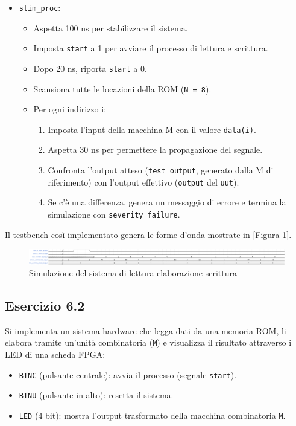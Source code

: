 \begin{enumerate}
\begin{itemize}
        \item \texttt{stim\_proc}:
        \begin{itemize}
            \item Aspetta 100 ns per stabilizzare il sistema.
            \item Imposta \texttt{start} a 1 per avviare il processo di lettura e scrittura.
            \item Dopo 20 ns, riporta \texttt{start} a 0.
            \item Scansiona tutte le locazioni della ROM (\texttt{N = 8}).
            \item Per ogni indirizzo i:
            \begin{enumerate}
                \item Imposta l'input della macchina M con il valore \texttt{data(i)}.
                \item Aspetta 30 ns per permettere la propagazione del segnale.
                \item Confronta l'output atteso (\texttt{test\_output}, generato dalla M di riferimento) con l'output effettivo (\texttt{output} del \texttt{uut}).
                \item Se c'è una differenza, genera un messaggio di errore e termina la simulazione con \texttt{severity failure}.
            \end{enumerate}
        \end{itemize}
    \end{itemize}
\end{enumerate}

Il testbench così implementato genera le forme d'onda mostrate in [Figura \ref{fig:rom_m_mem_tb}].

\begin{figure}[h]
    \centering
    \includegraphics[width=\textwidth]{img/rom_m_mem_tb.pdf}
    \caption{Simulazione del sistema di lettura-elaborazione-scrittura}
    \label{fig:rom_m_mem_tb}
\end{figure}

\subsection{Esercizio 6.2}
Si implementa un sistema hardware che legga dati da una memoria ROM, li elabora tramite un'unità combinatoria (\texttt{M}) e visualizza il risultato attraverso i LED di una scheda FPGA:
\begin{itemize}
    \item \texttt{BTNC} (pulsante centrale): avvia il processo (segnale \texttt{start}).
    \item \texttt{BTNU} (pulsante in alto): resetta il sistema.
    \item \texttt{LED} (4 bit): mostra l'output trasformato della macchina combinatoria \texttt{M}.
\end{itemize}

